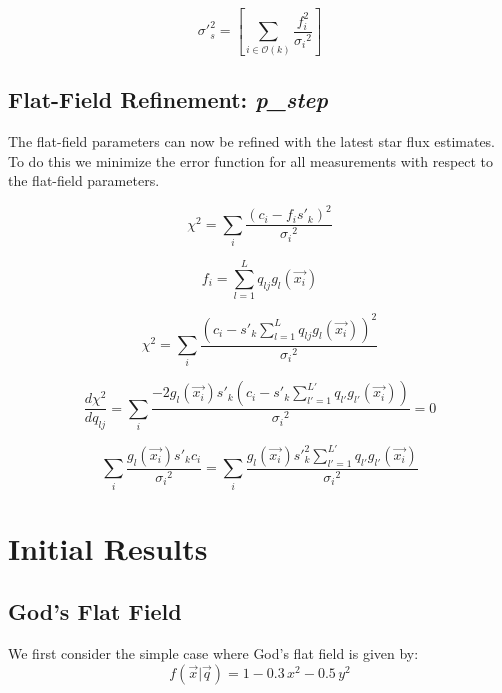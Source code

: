 \documentclass[manuscript]{aastex}
\begin{document}
\begin{displaymath}
\sigma'^2_s = \left[{\sum_{i \in \mathcal{O}(k)}  \frac{f_{i}^2}{{\sigma_i}^2}} \right]
\end{displaymath}


\subsection{Flat-Field Refinement: \textbf{\textit{p\_step}}}
The flat-field parameters can now be refined with the latest star flux estimates. To do this we minimize the error function for all measurements with respect to the flat-field parameters.

\begin{displaymath}
\chi^2 = \sum_{i} \frac{(c_i-f_{i}s'_{k})^2}{{\sigma_i}^2}
\end{displaymath}

\begin{displaymath}
f_{i} = \sum_{l = 1}^L q_{lj} g_l(\vec{x_i})
\end{displaymath}

\begin{displaymath}
\chi^2 = \sum_{i} \frac{(c_i- s'_{k} \sum_{l = 1}^L q_{lj} g_l(\vec{x_i}))^2}{{\sigma_i}^2}
\end{displaymath}

\begin{displaymath}
\frac{d\chi^2}{dq_{lj}} = \sum_{i} \frac{-2 g_l(\vec{x_i}) s'_{k} (c_i- s'_{k} \sum_{l' = 1}^{L'} q_{l'} g_{l'}(\vec{x_i}))}{{\sigma_i}^2} = 0
\end{displaymath}

\begin{displaymath}
\sum_{i} \frac{g_l(\vec{x_i}) s'_{k} c_i}{{\sigma_i}^2} = \sum_{i} \frac{g_l (\vec{x_i}) s'^2_{k} \sum_{l' = 1}^{L'} q_{l'} g_{l'} (\vec{x_i})} {{\sigma_i}^2}
\end{displaymath}

\section{Initial Results}

\subsection{God's Flat Field}
We first consider the simple case where God's flat field is given by:
\begin{displaymath}
f(\vec{x} | \vec{q}) = 1 - 0.3\,x^2 - 0.5\,y^2 
\end{displaymath}
\end{document}
